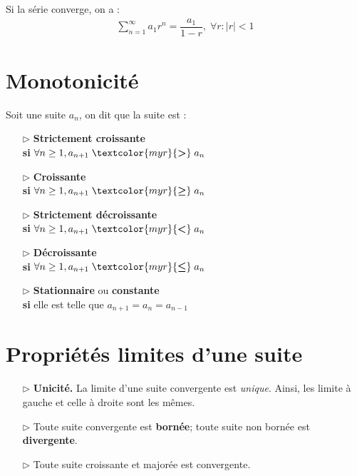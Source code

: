 \documentclass{report}
\begin{document}
\begin{multicols*}{3}
        Si la série converge, on a :
        \begin{align*}
            \boxed{
            \sum_{n=1}^{\infty }a_1r^{n} = 
            \dfrac{a_1}{1 - r}, \; \forall r \colon |r| < 1 
        }
        \end{align*}

    \section{Monotonicité} 
    Soit une suite $a_n$, on dit que la suite est : 
    \begin{itemize} 
        \item[$\rhd$ ] \textbf{Strictement croissante} 
            \\ \textbf{si} $\forall n \geq 1, a_{n+1} \; \textcolor{myr}{\boldsymbol{>}} \; a_n$         
        \item[$\rhd$ ] \textbf{Croissante} \\ 
            \textbf{si} $\forall n \geq 1, a_{n+1}\;  \textcolor{myr}{\boldsymbol{\geq}} \; a_n$         
        \item[$\rhd$ ] \textbf{Strictement décroissante} \\ 
            \textbf{si} $\forall n \geq 1, a_{n+1} \; \textcolor{myr}{\boldsymbol{<}}  \;a_n$ 
        \item[$\rhd$ ] \textbf{Décroissante} \\ 
            \textbf{si} $\forall n \geq 1, a_{n+1} \;  \textcolor{myr}{\boldsymbol{\leq}}  \; a_n$ 
        \item[$\rhd$ ] \textbf{Stationnaire} ou \textbf{constante} \\ 
            \textbf{si} elle est telle que $a_{n+1} = a_n = a_{n-1}$
    \end{itemize}

    \section{Propriétés limites d'une suite}
    \begin{itemize}
        \item[$\rhd$] \textbf{Unicité.} La limite d'une suite convergente est \textit{unique}. Ainsi, les limite à gauche 
            et celle à droite sont les mêmes. 
        
        \item[$\rhd$] Toute suite convergente est \textbf{bornée};  
            toute suite non bornée est \textbf{divergente}.        
        \item[$\rhd$] Toute suite croissante et majorée est convergente. 


\end{itemize}
\end{multicols*}
\end{document}
